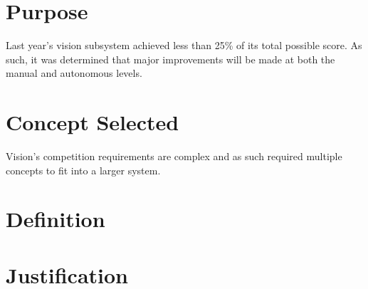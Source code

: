 \documentclass[]{auvsi_doc}
\begin{document}
\begin{AUVSITitlePage}
\begin{artifacttable}
\end{artifacttable}
\end{AUVSITitlePage}

\section{Purpose}

Last year's vision subsystem achieved less than 25\% of its total possible score. As such, it was determined that major improvements will be made at both the manual and autonomous levels.

\section{Concept Selected}

Vision's competition requirements are complex and as such required multiple concepts to fit into a larger system. 

\section{Definition}

\section{Justification}

\end{document}
